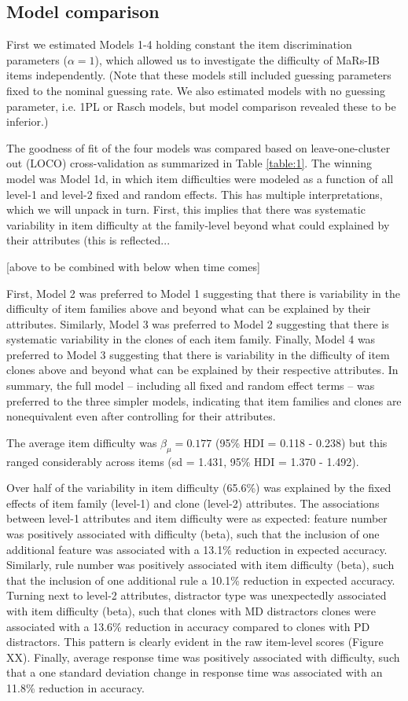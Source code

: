 \documentclass[a4paper,man,natbib]{apa6}
\begin{document}
\subsection{Model comparison}

First we estimated Models 1-4 holding constant the item discrimination parameters ($\alpha = 1$), which allowed us to investigate the difficulty of MaRs-IB items independently. (Note that these models still included guessing parameters fixed to the nominal guessing rate. We also estimated models with no guessing parameter, i.e. 1PL or Rasch models, but model comparison revealed these to be inferior.) 

The goodness of fit of the four models was compared based on leave-one-cluster out (LOCO) cross-validation as summarized in Table \ref{table:1}. The winning model was Model 1d, in which item difficulties were modeled as a function of all level-1 and level-2 fixed and random effects. This has multiple interpretations, which we will unpack in turn. First, this implies that there was systematic variability in item difficulty at the family-level beyond what could explained by their attributes (this is reflected...

[above to be combined with below when time comes]

First, Model 2 was preferred to Model 1 suggesting that there is variability in the difficulty of item families above and beyond what can be explained by their attributes. Similarly, Model 3 was preferred to Model 2 suggesting that there is systematic variability in the clones of each item family. Finally, Model 4 was preferred to Model 3 suggesting that there is variability in the difficulty of item clones above and beyond what can be explained by their respective attributes. In summary, the full model -- including all fixed and random effect terms -- was preferred to the three simpler models, indicating that item families and clones are nonequivalent even after controlling for their attributes.

The average item difficulty was $\beta_\mu = 0.177$ (95\% HDI = 0.118 - 0.238) but this ranged considerably across items (sd = 1.431, 95\% HDI = 1.370 - 1.492). 


Over half of the variability in item difficulty (65.6\%) was explained by the fixed effects of item family (level-1) and clone (level-2) attributes. The associations between level-1 attributes and item difficulty were as expected: feature number was positively associated with difficulty (beta), such that the inclusion of one additional feature was associated with a 13.1\% reduction in expected accuracy. Similarly, rule number was positively associated with item difficulty (beta), such that the inclusion of one additional rule a 10.1\% reduction in expected accuracy. Turning next to level-2 attributes, distractor type was unexpectedly associated with item difficulty (beta), such that clones with MD distractors clones were associated with a 13.6\% reduction in accuracy compared to clones with PD distractors. This pattern is clearly evident in the raw item-level scores (Figure XX). Finally, average response time was positively associated with difficulty, such that a one standard deviation change in response time was associated with an 11.8\% reduction in accuracy. 
\end{document}
